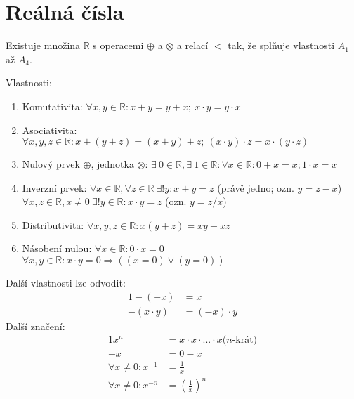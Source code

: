 \section{Reálná čísla}

\begin{theoremAlph}
	Existuje množina $\mathbb{R}$ s operacemi $\oplus$ a $\otimes$ a relací $<$ tak,
	že splňuje vlastnosti \textit{$A_1$} až \textit{$A_4$}.
\end{theoremAlph}

\begin{property}
	Vlastnosti:

	\begin{enumerate}[I]
		\item Komutativita: $\forall x, y \in \mathbb{R}: x + y = y + x;~x\cdot y = y\cdot x$
		\item Asociativita: $\forall x, y, z \in \mathbb{R}: x + (y + z) = (x + y) + z;~(x\cdot y)\cdot z = x\cdot (y\cdot z)$
		\item Nulový prvek $\oplus$, jednotka $\otimes$: $\exists~0 \in \mathbb{R}, \exists~1 \in \mathbb{R}:
		\forall x \in \mathbb{R}: 0 + x = x; 1 \cdot x = x$ 
		\item Inverzní prvek: $\forall x \in \mathbb{R}, \forall z \in \mathbb{R}~\exists ! y: x + y = z$ (právě jedno; ozn. $y = z - x$)\newline
		$\forall x, z \in \mathbb{R}, x\neq0 ~\exists ! y \in \mathbb{R}: x \cdot y = z$ (ozn. $y = z / x$)
		\item Distributivita: $\forall x, y, z \in \mathbb{R}: x (y + z) = xy + xz$
		\item Násobení nulou: $\forall x \in \mathbb{R}: 0\cdot x = 0$\newline
		$\forall x, y \in \mathbb{R}: x\cdot y = 0 \Rightarrow ((x = 0) \lor (y = 0))$
	\end{enumerate}
\end{property}
Další vlastnosti lze odvodit:
\begin{alignat}{1}
	-(-x) &= x \\
	-(x\cdot y) &= (-x)\cdot y
\end{alignat}
Další značení:
\begin{alignat}{1}
	x^n &= x\cdot x\cdot \text{...} \cdot x \text{($n$-krát)} \\
	-x &= 0 - x \\
	\forall x \neq 0: x^{-1} &= \frac{1}{x} \\
	\forall x \neq 0: x^{-n} &= \left( \frac{1}{x} \right)^n
\end{alignat}

